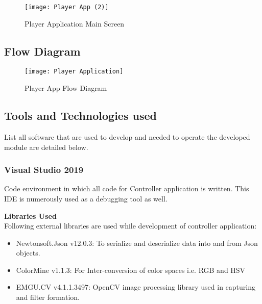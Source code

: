 \begin{figure}[h]
  \centering
  \texttt{[image: Player App (2)]}
  \caption{Player Application Main Screen}
\end{figure}

\newpage
\subsection{Flow Diagram}
\begin{figure}[h]
  \centering
  \texttt{[image: Player Application]}
  \caption{Player App Flow Diagram}
\end{figure}

\subsection{Tools and Technologies used}
List all software that are used to develop and needed to operate the developed module are detailed below.

\subsubsection{Visual Studio 2019}
Code environment in which all code for Controller application is written. This IDE is numerously used as a debugging tool as well.

\textbf{Libraries Used}\\
Following external libraries are used while development of controller application:

\begin{itemize}

\item Newtonsoft.Json v12.0.3: To serialize and deserialize data into and from Json objects.
\item ColorMine v1.1.3: For Inter-conversion of color spaces i.e. RGB and HSV
\item EMGU.CV v4.1.1.3497: OpenCV image processing library used in capturing and filter formation.

\end{itemize}












































